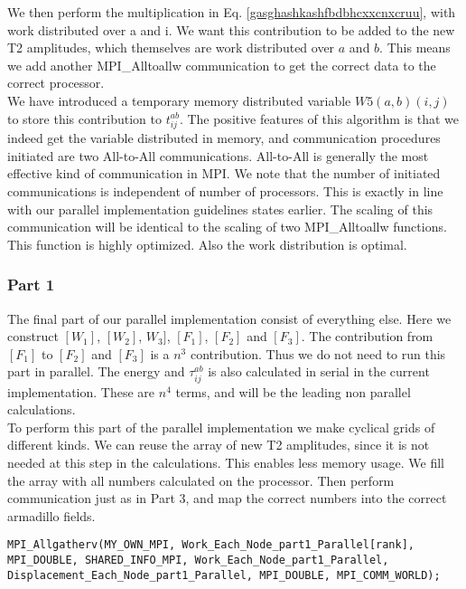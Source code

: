 \documentclass[a4paper,norsk,11pt,twoside]{report}
\begin{document}
We then perform the multiplication in Eq. \eqref{gasghashkashfbdbhcxxcnxcruu}, with work distributed over a and i. We want this contribution to be added to the new T2 amplitudes, which themselves are work distributed over $a$ and $b$. This means we add another MPI\_Alltoallw communication to get the correct data to the correct processor. \\

We have introduced a temporary memory distributed variable $W5(a,b)(i,j)$ to store this contribution to $t_{ij}^{ab}$. The positive features of this algorithm is that we indeed get the variable distributed in memory, and communication procedures initiated are two All-to-All communications. All-to-All is generally the most effective kind of communication in MPI. We note that the number of initiated communications is independent of number of processors. This is exactly in line with our parallel implementation guidelines states earlier. The scaling of this communication will be identical to the scaling of two MPI\_Alltoallw functions. This function is highly optimized. Also the work distribution is optimal.

\subsubsection{Part 1 \label{problem_part_ccsd_parallel}}
The final part of our parallel implementation consist of everything else. Here we construct $[W_1]$, $[W_2]$, $W_3]$, $[F_1]$, $[F_2]$ and $[F_3]$. The contribution from $[F_1]$ to $[F_2]$ and $[F_3]$ is a $n^3$ contribution. Thus we do not need to run this part in parallel. The energy and $\tau_{ij}^{ab}$ is also calculated in serial in the current implementation. These are $n^4$ terms, and will be the leading non parallel calculations. \\

To perform this part of the parallel implementation we make cyclical grids of different kinds. We can reuse the array of new T2 amplitudes, since it is not needed at this step in the calculations. This enables less memory usage. We fill the array with all numbers calculated on the processor. Then perform communication just as in Part 3, and map the correct numbers into the correct armadillo fields. \\

\begin{lstlisting}
MPI_Allgatherv(MY_OWN_MPI, Work_Each_Node_part1_Parallel[rank], MPI_DOUBLE, SHARED_INFO_MPI, Work_Each_Node_part1_Parallel, Displacement_Each_Node_part1_Parallel, MPI_DOUBLE, MPI_COMM_WORLD);
\end{lstlisting}
\end{document}
